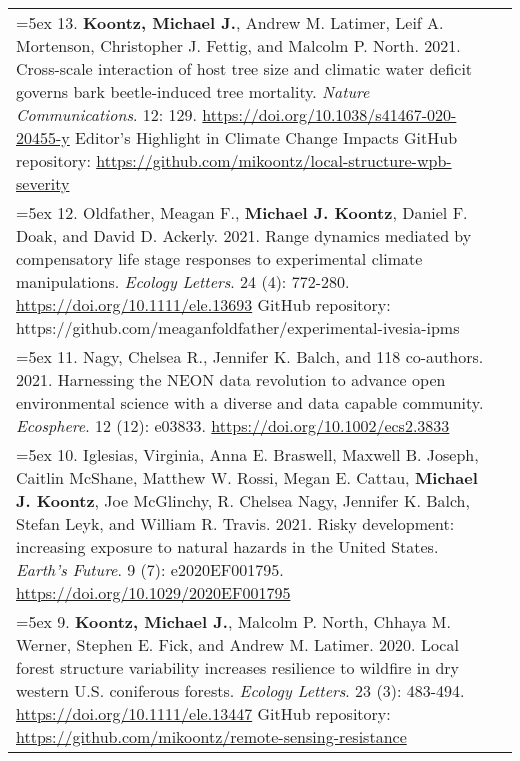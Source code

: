 \begin{longtable}{@{} >{\raggedright}p{6.10in} >{\raggedleft}X @{}}
\hangindent=5ex 13. \textbf{Koontz, Michael J.}, Andrew M. Latimer, Leif A. Mortenson, Christopher J. Fettig, and Malcolm P. North. 2021. Cross-scale interaction of host tree size and climatic water deficit governs bark beetle-induced tree mortality. \emph{Nature Communications}. 12: 129. \href{https://doi.org/10.1038/s41467-020-20455-y}{https://doi.org/10.1038/s41467-020-20455-y}
\newline *Editor's Highlight in Climate Change Impacts %
\newline GitHub repository: \href{https://github.com/mikoontz/local-structure-wpb-severity}{https://github.com/mikoontz/local-structure-wpb-severity} & \tabularnewline

\hangindent=5ex 12. Oldfather, Meagan F., \textbf{Michael J. Koontz}, Daniel F. Doak, and David D. Ackerly. 2021. Range dynamics mediated by compensatory life stage responses to experimental climate manipulations. \emph{Ecology Letters}. 24 (4): 772-280. \href{https://doi.org/10.1111/ele.13693}{https://doi.org/10.1111/ele.13693}
\newline GitHub repository: https://github.com/meaganfoldfather/experimental-ivesia-ipms & \tabularnewline

\hangindent=5ex 11. Nagy, Chelsea R., Jennifer K. Balch, and 118 co-authors. 2021. Harnessing the NEON data revolution to advance open environmental science with a diverse and data capable community. \emph{Ecosphere}. 12 (12): e03833. \href{https://doi.org/10.1002/ecs2.3833}{https://doi.org/10.1002/ecs2.3833} & \tabularnewline

\hangindent=5ex 10. Iglesias, Virginia, Anna E. Braswell, Maxwell B. Joseph, Caitlin McShane, Matthew W. Rossi, Megan E. Cattau, \textbf{Michael J. Koontz}, Joe McGlinchy, R. Chelsea Nagy, Jennifer K. Balch, Stefan Leyk, and William R. Travis. 2021. Risky development: increasing exposure to natural hazards in the United States. \emph{Earth's Future}. 9 (7): e2020EF001795. \href{https://doi.org/10.1029/2020EF001795}{https://doi.org/10.1029/2020EF001795} & \tabularnewline

\hangindent=5ex 9. \textbf{Koontz, Michael J.}, Malcolm P. North, Chhaya M. Werner, Stephen E. Fick, and Andrew M. Latimer. 2020. Local forest structure variability increases resilience to wildfire in dry western U.S. coniferous forests. \emph{Ecology Letters}. 23 (3): 483-494. \href{https://doi.org/10.1111/ele.13447}{https://doi.org/10.1111/ele.13447} 
\newline GitHub repository: \href{https://github.com/mikoontz/remote-sensing-resistance}{https://github.com/mikoontz/remote-sensing-resistance} & \tabularnewline


\end{longtable}
